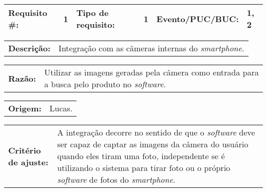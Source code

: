
\par \noindent
\begin{table}[h]
    \begin{tabularx}{\textwidth}{
        p{}
        p{}
        p{}
        p{}
        p{}
        p{}
    }
    \toprule
        \textbf{Requisito \#:}          & 1 
        & \textbf{Tipo de requisito:}   & 1
        & \textbf{Evento/PUC/BUC:}      & 1, 2 \\
    \midrule
    \end{tabularx}
    \vspace{5pt}
    \begin{tabularx}{\textwidth}{p{}  p{}}
        \textbf{Descrição:} &
        Integração com as câmeras internas do \emph{smartphone}.
    \end{tabularx}
    
    \vspace{5pt}
    \begin{tabularx}{\textwidth}{p{}  p{}}
        \textbf{Razão:} &
        Utilizar as imagens geradas pela câmera como entrada para a 
        busca pelo produto no \emph{software}.
    \end{tabularx}
    
    \vspace{5pt}
    \begin{tabularx}{\textwidth}{p{} p{}}
        \textbf{Origem:} &
        Lucas.
    \end{tabularx}
    
    \vspace{5pt}
    \begin{tabularx}{\textwidth}{p{} p{}}
        \textbf{Critério de ajuste:} &
        A integração decorre no sentido de que o \emph{software} deve 
        ser capaz de captar as imagens da câmera do usuário quando 
        eles tiram uma foto, independente se é utilizando o sistema 
        para tirar foto ou o próprio \emph{software} de fotos do 
        \emph{smartphone}. 
    \end{tabularx}
    

\end{table}
